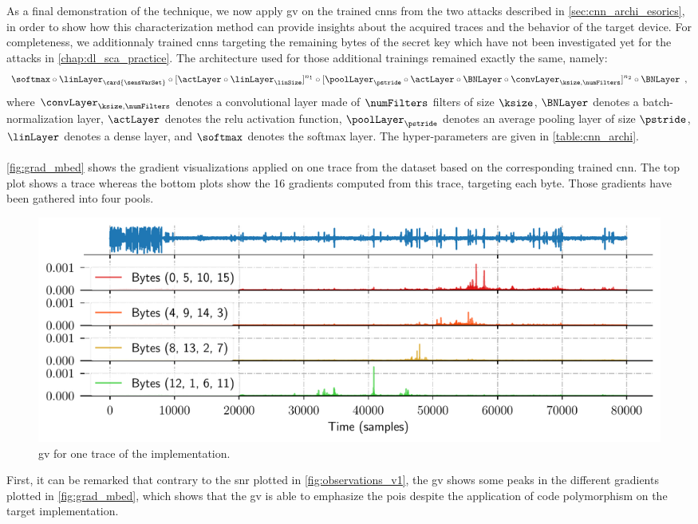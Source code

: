 As a final demonstration of the technique, we now apply \gls{gv} on the trained \glspl{cnn} from the two attacks \attCNN{} described in \autoref{sec:cnn_archi_esorics}, in order to show how this characterization method can provide insights about the acquired traces and the behavior of the target device.
For completeness, we additionnaly trained \glspl{cnn} targeting the remaining bytes of the secret key which have not been investigated yet for the attacks \attCNN{} in \autoref{chap:dl_sca_practice}.
The architecture used for those additional trainings remained exactly the same, namely:
\begin{equation}\label{eq:vgg_archi_esorics_grad}
	\softmax \circ \linLayer_{\card{\sensVarSet}} \circ [\actLayer \circ \linLayer_\linSize]^{n_1}
	\circ [\poolLayer_\pstride \circ \actLayer \circ \BNLayer \circ \convLayer_{\ksize, \numFilters}]^{n_2} \circ \BNLayer \enspace ,
\end{equation}
where \(\convLayer_{\ksize, \numFilters}\) denotes a convolutional layer made of \(\numFilters\) filters of size \(\ksize\), \(\BNLayer\) denotes a batch-normalization layer, \(\actLayer\) denotes the \gls{relu} activation function, \(\poolLayer_{\pstride}\) denotes an average pooling layer of size \(\pstride\), \(\linLayer\) denotes a dense layer, and \(\softmax\) denotes the softmax layer.
The hyper-parameters are given in \autoref{table:cnn_archi}.

\paragraph{\mbedTLS{}}
\autoref{fig:grad_mbed} shows the gradient visualizations applied on one trace from the \mbedTLS{} dataset based on the corresponding trained \gls{cnn}.
The top plot shows a trace whereas the bottom plots show the 16 gradients computed from this trace, targeting each byte.
Those gradients have been gathered into four pools.
\begin{figure}
	\centering
	\includegraphics[width=\textwidth]{../Chapter6/Figures/grad_viz/v1/grads}
	\caption{\gls{gv} for one trace of the \mbedTLS{} implementation.}
	\label{fig:grad_mbed}
\end{figure}
First, it can be remarked that contrary to the \gls{snr} plotted in \autoref{fig:observations_v1}, the \gls{gv} shows some peaks in the different gradients plotted in \autoref{fig:grad_mbed}, which shows that the \gls{gv} is able to emphasize the \glspl{poi} despite the application of code polymorphism on the target implementation.

